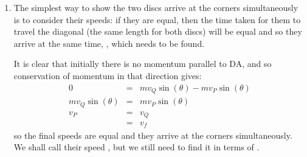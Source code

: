 \begin{problem}
{\begin{enumerate}
To transform into the ZMF we need to find the speed of the ZMF,  for two discs moving along a line. Here we find  and so we subtract this from the velocity of everything. The table is then also moving backwards at , as indicated at the bottom of both cells in Figure \ref{fig:Dynamics_ZMF_table_collision}, but this does not affect the system. Once  has been subtracted, we get the situation in Figure \ref{fig:Dynamics_ZMF_table_collision} cell .
After the collision in the ZMF both discs must have the same speed, , in opposite directions and at some angle \vari{\phi} with with direction DA, in order that momentum be zero and energy be conserved. Since the masses are equal, moving in opposite directions at the same speed will sum to zero momentum and the kinetic energy loss is (probably) not total so they must have a non-zero speed. It will become clear later that \vari{\phi} is in fact , but for now an arbitrary angle will suffice; since any direction will give a total momentum of zero.

	\item The simplest way to show the two discs arrive at the corners simultaneously is to consider their speeds: if they are equal, then the time taken for them to travel the diagonal (the same length for both discs) will be equal and so they arrive at the same time, , which needs to be found.

It is clear that initially there is no momentum parallel to DA, and so conservation of momentum in that direction gives:
\begin{eqnarray*} 
0 &=& mv_{Q} \sin(\theta) - mv_{P}\sin(\theta) \\ 
mv_{Q}\sin(\theta) &=& mv_{P}\sin(\theta) \\ 
v_{P} &=& v_{Q} \\ 
&=& v_{f}
\end{eqnarray*}
so the final speeds are equal and they arrive at the corners simultaneously. We shall call their speed , but we still need to find it in terms of .


\end{enumerate}}
\end{problem}
